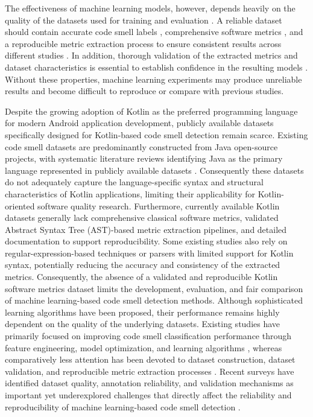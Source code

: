 \documentclass[]{einformatica}
\begin{document}
The effectiveness of machine learning models, however, depends heavily on the quality of the datasets used for training and evaluation \cite{MESBAH2026108242}. A reliable dataset should contain accurate code smell labels \cite{zhang2026sacscodesmelldataset}, comprehensive software metrics \cite{ZHANG2024112131}, and a reproducible metric extraction process to ensure consistent results across different studies \cite{LEWOWSKI2022106783}. In addition, thorough validation of the extracted metrics and dataset characteristics is essential to establish confidence in the resulting models \cite{Alomari2025}. Without these properties, machine learning experiments may produce unreliable results and become difficult to reproduce or compare with previous studies.

Despite the growing adoption of Kotlin as the preferred programming language for modern Android application development, publicly available datasets specifically designed for Kotlin-based code smell detection remain scarce. Existing code smell datasets are predominantly constructed from Java open-source projects, with systematic literature reviews identifying Java as the primary language represented in publicly available datasets \cite{Zakeri_Nasrabadi_2023}\cite{app14146149}\cite{Alomari2025}\cite{11316404}\cite{madeyski_2020_3666840}. Consequently these datasets do not adequately capture the language-specific syntax and structural characteristics of Kotlin applications, limiting their applicability for Kotlin-oriented software quality research. Furthermore, currently available Kotlin datasets generally lack comprehensive classical software metrics, validated Abstract Syntax Tree (AST)-based metric extraction pipelines, and detailed documentation to support reproducibility. Some existing studies also rely on regular-expression-based techniques or parsers with limited support for Kotlin syntax, potentially reducing the accuracy and consistency of the extracted metrics. Consequently, the absence of a validated and reproducible Kotlin software metrics dataset limits the development, evaluation, and fair comparison of machine learning-based code smell detection methods. Although sophisticated learning algorithms have been proposed, their performance remains highly dependent on the quality of the underlying datasets. Existing studies have primarily focused on improving code smell classification performance through feature engineering, model optimization, and learning algorithms \cite{Zakeri_Nasrabadi_2023}\cite{ZHANG2024112131}, whereas comparatively less attention has been devoted to dataset construction, dataset validation, and reproducible metric extraction processes \cite{ZHANG2024127014}. Recent surveys have identified dataset quality, annotation reliability, and validation mechanisms as important yet underexplored challenges that directly affect the reliability and reproducibility of machine learning-based code smell detection \cite{zhang2026sacscodesmelldataset}.
\end{document}
